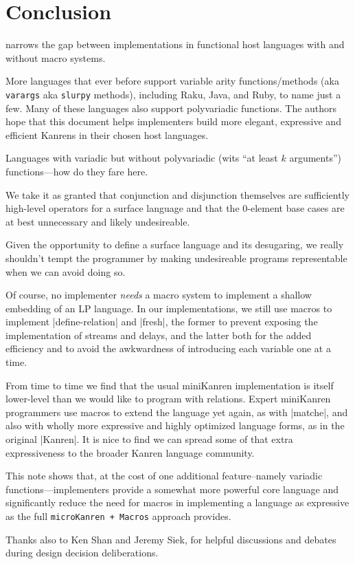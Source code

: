 \documentclass[sigplan,screen,draft,anonymous,review,natbib=false]{acmart}
\begin{document}
\section{Conclusion}\label{sec:conclusion}

narrows the gap between implementations in functional host languages
with and without macro systems.

More languages that ever before support variable arity
functions/methods (aka \verb|varargs| aka \verb|slurpy| methods),
including Raku, Java, and Ruby, to name just a few. Many of these
languages also support polyvariadic functions. The authors hope that
this document helps implementers build more elegant, expressive and
efficient Kanrens in their chosen host languages.

Languages with variadic but without polyvariadic (wits \enquote{at
  least $k$ arguments}) functions---how do they fare here.

We take it as granted that conjunction and disjunction themselves are
sufficiently high-level operators for a surface language and that the
0-element base cases are at best unnecessary and likely undesireable.

Given the opportunity to define a surface language and its desugaring,
we really shouldn't tempt the programmer by making undesireable
programs representable when we can avoid doing so.

Of course, no implementer \emph{needs} a macro system to implement a
shallow embedding of an LP language. In our implementations, we still
use macros to implement \rackinline|define-relation| and
\rackinline|fresh|, the former to prevent exposing the implementation
of streams and delays, and the latter both for the added efficiency
and to avoid the awkwardness of introducing each variable one at a
time.

From time to time we find that the usual miniKanren implementation is
itself lower-level than we would like to program with relations.
Expert miniKanren programmers use macros to extend the language yet
again, as with \rackinline|matche|, and also with wholly more
expressive and highly optimized language forms, as in the original
\rackinline|Kanren|. It is nice to find we can spread some of that
extra expressiveness to the broader Kanren language community.

This note shows that, at the cost of one additional feature--namely
variadic functions---implementers provide a somewhat more powerful
core language and significantly reduce the need for macros in
implementing a language as expressive as the full
\verb|microKanren + Macros| approach provides.

\begin{acks}

Thanks also to Ken Shan and Jeremy Siek, for helpful discussions and
debates during design decision deliberations.

\end{acks}

\printbibliography{}
\end{document}
